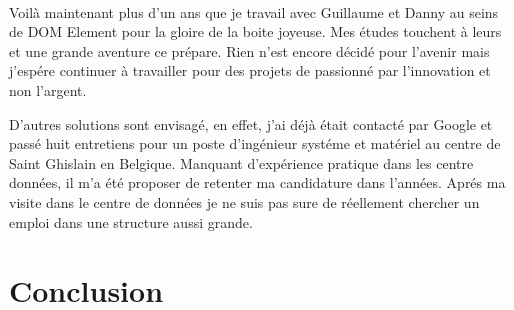 \documentclass[11pt, a4paper ]{article}
\let\stdsection\section
\renewcommand\section{\newpage\stdsection}
\begin{document}
\begin{spacing}{1.5}
\paragraph{}
Voilà maintenant plus d'un ans que je travail avec Guillaume et Danny au seins de DOM Element pour la gloire de la boite joyeuse. Mes études touchent à leurs et une grande aventure ce prépare. Rien n'est encore décidé pour l'avenir mais j'espére continuer à travailler pour des projets de passionné par l'innovation et non l'argent.

D'autres solutions sont envisagé, en effet, j'ai déjà était contacté par Google et passé huit entretiens pour un poste d'ingénieur systéme et matériel au centre de Saint Ghislain en Belgique. Manquant d'expérience pratique dans les centre données, il m'a été proposer de retenter ma candidature dans l'années. Aprés ma visite dans le centre de données je ne suis pas sure de réellement chercher un emploi dans une structure aussi grande.















	\section{Conclusion} %






\end{spacing}
\end{document}
